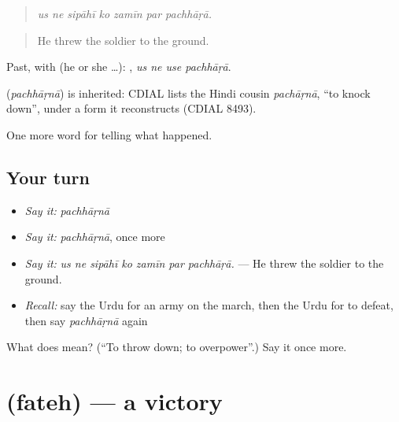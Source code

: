 \begin{quote}
      
\end{quote}

\begin{quote}
\emph{us ne sipāhī ko zamīn par pachhāṛā.}
\end{quote}

\begin{quote}
He threw the soldier to the ground.
\end{quote}

Past, with  (he or she …):    , \emph{us ne use pachhāṛā}.

\begin{cousinweb}
\textbf{} (\emph{pachhāṛnā}) is inherited: CDIAL lists the Hindi cousin \emph{pachāṛnā}, \textquotedblleft{}to knock down\textquotedblright{}, under a form it reconstructs (CDIAL 8493).
\end{cousinweb}

\begin{grammarlens}[title={What you've built}]
One more word for telling what happened.
\end{grammarlens}

\subsection*{Your turn}
\begin{itemize}
\raggedright
  \item \emph{Say it:} \emph{pachhāṛnā}
  \item \emph{Say it:} \emph{pachhāṛnā}, once more
  \item \emph{Say it:} \emph{us ne sipāhī ko zamīn par pachhāṛā.} — He threw the soldier to the ground.
  \item \emph{Recall:} say the Urdu for an army on the march, then the Urdu for to defeat, then say \emph{pachhāṛnā} again
\end{itemize}

\begin{tcolorbox}[breakable,colback=teal!4,colframe=teal!35!black,title={Before you move on}]
What does  mean? (\textquotedblleft{}To throw down; to overpower\textquotedblright{}.) Say it once more.
\end{tcolorbox}
\section[\texorpdfstring{\ur{فتح} (fateh)}{فتح (fateh)}]{ (fateh) — a victory}

